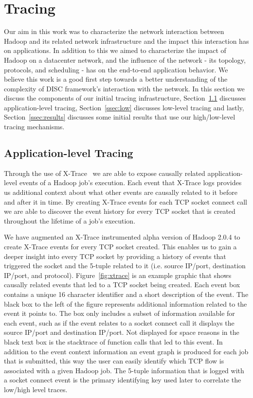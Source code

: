 \section{Tracing}
\label{sec:tracing}
Our aim in this work was to characterize the network interaction 
between Hadoop and its related network infrastructure and the impact this 
interaction has on applications. In addition to this we aimed to 
characterize the impact of Hadoop on a datacenter network, and the 
influence of the network - its topology, protocols, and scheduling - has on the 
end-to-end application behavior. We believe this work is a good first step 
towards a better understanding of the complexity of DISC framework's interaction
with the network. In this section we discuss the components of our initial tracing
infrastructure, Section~\ref{ssec:app} discusses application-level tracing, 
Section~\ref{ssec:low} discusses low-level tracing and lastly, 
Section~\ref{ssec:results} discusses some initial results that use our high/low-level
tracing mechanisms.

\subsection{Application-level Tracing}
\label{ssec:app}
Through the use of X-Trace~\cite{xtrace} we are able to expose causally related 
application-level events of a Hadoop job's execution. Each event that X-Trace
logs provides us additional context about what other events are causally related
to it before and after it in time. By creating X-Trace 
events for each TCP socket connect call we are able to discover the event history
for every TCP socket that is created throughout the lifetime of a job's execution.

We have augmented an X-Trace instrumented alpha version of Hadoop 2.0.4 to create 
X-Trace events for every TCP socket created. This enables us to gain a deeper insight
into every TCP socket by providing a history of events that triggered the socket and
the 5-tuple related to it (i.e. source IP/port, destination IP/port, and protocol).
Figure~\ref{fig:xtrace} is an example graphic that shows causally related events that
led to a TCP socket being created. Each event box contains a unique 16 character 
identifier and a short description of the event. The black box to the left of the 
figure represents additional information related to the event it points to. The box only 
includes a subset of information available for each event, such as if the event relates to a socket
connect call it displays the source IP/port and destination IP/port. Not displayed for space
reasons in the black text box is the stacktrace of function calls that led to this event. In 
addition to the event context information an event graph is produced for each job that is 
submitted, this way the user can easily identify which TCP flow is associated with a given 
Hadoop job. The 5-tuple information that is logged with a socket connect event is the 
primary identifying key used later to correlate the low/high level traces.

